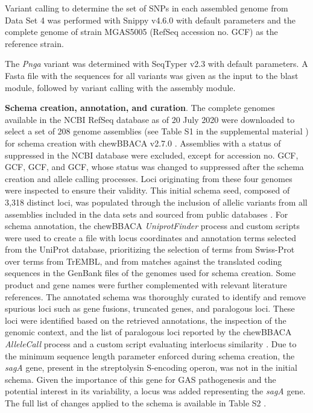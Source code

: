 Variant calling to determine the set of \acp{SNP} in each assembled genome from Data Set 4 \cite{friaes_supplemental_2023} was performed with Snippy v4.6.0 \cite{noauthor_release_nodate-3} with default parameters and the complete genome of strain MGAS5005 (RefSeq accession no. GCF) as the reference strain.

The \textit{Pnga} variant was determined with SeqTyper v2.3 \cite{noauthor_b-ummiseq_typing_2025} with default parameters. A Fasta ﬁle with the sequences for all variants was given as the input to the blast module, followed by variant calling with the assembly module.

\textbf{Schema creation, annotation, and curation}. The complete genomes available in the \ac{NCBI} RefSeq database as of 20 July 2020 were downloaded to select a set of 208 genome assemblies (see Table S1 in the supplemental material \cite{friaes_supplemental_2023}) for schema creation with chewBBACA v2.7.0 \cite{silva_chewbbaca_2018}. Assemblies with a status of suppressed in the \ac{NCBI} database were excluded, except for accession no. GCF, GCF, GCF, and GCF, whose status was changed to suppressed after the schema creation and allele calling processes. Loci originating from these four genomes were inspected to ensure their validity. This initial schema seed, composed of 3,318 distinct loci, was populated through the inclusion of allelic variants from all assemblies included in the data sets and sourced from public databases \cite{blackwell_exploring_2021, oleary_reference_2016}. For schema annotation, the chewBBACA \textit{UniprotFinder} process and custom scripts \cite{noauthor_release_nodate-4} were used to create a file with locus coordinates and annotation terms selected from the UniProt database, prioritizing the selection of terms from Swiss-Prot over terms from TrEMBL, and from matches against the translated coding sequences in the GenBank files of the genomes used for schema creation. Some product and gene names were further complemented with relevant literature references. The annotated schema was thoroughly curated to identify and remove spurious loci such as gene fusions, truncated genes, and paralogous loci. These loci were identified based on the retrieved annotations, the inspection of the genomic context, and the list of paralogous loci reported by the chewBBACA \textit{AlleleCall} process and a custom script evaluating interlocus similarity \cite{noauthor_release_nodate-4}. Due to the minimum sequence length parameter enforced during schema creation, the \textit{sagA} gene, present in the streptolysin S-encoding operon, was not in the initial schema. Given the importance of this gene for \ac{GAS} pathogenesis and the potential interest in its variability, a locus was added representing the \textit{sagA} gene. The full list of changes applied to the schema is available in Table S2 \cite{friaes_supplemental_2023}.

